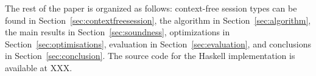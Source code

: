 
The rest of the paper is organized as follows: context-free session
types can be found in Section~\ref{sec:contextfreesession}, the
algorithm in Section~\ref{sec:algorithm}, the main results in
Section~\ref{sec:soundness}, optimizations in
Section~\ref{sec:optimisations}, evaluation in
Section~\ref{sec:evaluation}, and conclusions in
Section~\ref{sec:conclusion}.
%
The source code for the Haskell implementation is available at XXX.

